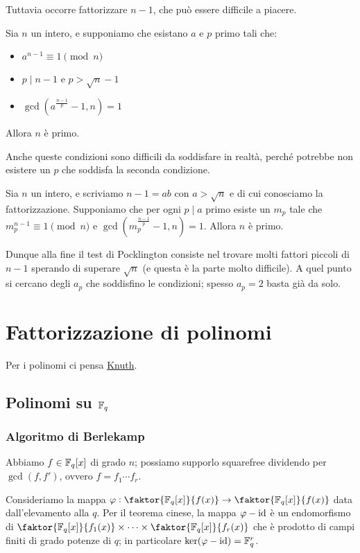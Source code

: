 \documentclass[a4paper]{book}
\begin{document}
    Tuttavia occorre fattorizzare $n-1$, che può essere difficile a piacere.

    \begin{proposition}
        Sia $n$ un intero, e supponiamo che esistano $a$ e $p$ primo tali che:
        \begin{itemize}
            \item $a^{n-1}\equiv1\pmod n$
            \item $p\mid n-1$ e $p>\sqrt n -1$
            \item $\gcd(a^{\frac{n-1}{p}}-1,n)=1$
        \end{itemize}
        Allora $n$ è primo.
    \end{proposition}
    Anche queste condizioni sono difficili da soddisfare in realtà, perché potrebbe non esistere un $p$ che soddisfa la seconda condizione.

    \begin{proposition}
        Sia $n$ un intero, e scriviamo $n-1=ab$ con $a>\sqrt n$ e di cui conosciamo la fattorizzazione. Supponiamo che per ogni $p\mid a$ primo esiste un $m_p$ tale che $m_p^{n-1}\equiv1\pmod n$ e $\gcd(m_p^{\frac{n-1}{p}}-1,n)=1$. Allora $n$ è primo.
    \end{proposition}

    \bigskip
    Dunque alla fine il test di Pocklington consiste nel trovare molti fattori piccoli di $n-1$ sperando di superare $\sqrt n$ (e questa è la parte molto difficile). A quel punto si cercano degli $a_p$ che soddisfino le condizioni; spesso $a_p=2$ basta già da solo.


    \section{Fattorizzazione di polinomi}
    Per i polinomi ci pensa \href{http://people.dm.unipi.it/gianni/TC&C/fattorizzazione.pdf}{Knuth}.

    \subsection{Polinomi su $\mathbb{F}_q$}
    \subsubsection{Algoritmo di Berlekamp}
    Abbiamo $f\in\mathbb{F}_q[x]$ di grado $n$; possiamo supporlo squarefree dividendo per $\gcd(f,f')$, ovvero $f=f_1\cdots f_r$.

    Consideriamo la mappa $\varphi:\faktor{\F_q[x]}{f(x)}\to \faktor{\F_q[x]}{f(x)}$ data dall'elevamento alla $q$. Per il teorema cinese, la mappa $\varphi-\operatorname{id}$ è un endomorfismo di $\faktor{\F_q[x]}{f_1(x)}\times\dots\times\faktor{\F_q[x]}{f_r(x)}$ che è prodotto di campi finiti di grado potenze di $q$; in particolare $\ker(\varphi-\operatorname{id})=\mathbb{F}_q^r$.
\end{document}
